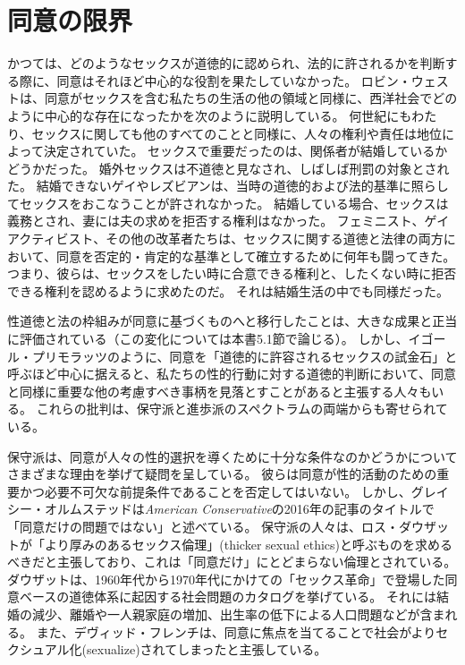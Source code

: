 \documentclass[paper=a4,book,openany]{jlreq}
\newcommand{\ig}[1]{}           %
\begin{document}
\section{同意の限界}

かつては、どのようなセックスが道徳的に認められ、法的に許されるかを判断する際に、同意はそれほど中心的な役割を果たしていなかった。
ロビン・ウェスト\ig{Robin West}は、同意がセックスを含む私たちの生活の他の領域と同様に、西洋社会でどのように中心的な存在になったかを次のように説明している。
何世紀にもわたり、セックスに関しても他のすべてのことと同様に、人々の権利や責任は地位によって決定されていた。
セックスで重要だったのは、関係者が結婚しているかどうかだった。
婚外セックスは不道徳と見なされ、しばしば刑罰の対象とされた。
結婚できないゲイやレズビアンは、当時の道徳的および法的基準に照らしてセックスをおこなうことが許されなかった。
結婚している場合、セックスは義務とされ、妻には夫の求めを拒否する権利はなかった。
フェミニスト、ゲイアクティビスト、その他の改革者たちは、セックスに関する道徳と法律の両方において、同意を否定的・肯定的な基準として確立するために何年も闘ってきた。
つまり、彼らは、セックスをしたい時に合意できる権利と、したくない時に拒否できる権利を認めるように求めたのだ。
それは結婚生活の中でも同様だった\citep[p.7]{west20:_consen_legit_dysph}。

性道徳と法の枠組みが同意に基づくものへと移行したことは、大きな成果と正当に評価されている（この変化については本書5.1節で論じる）。
しかし、イゴール・プリモラッツのように、同意を「道徳的に許容されるセックスの試金石」\citep{primoratz01:_sexual_moral}と呼ぶほど中心に据えると、私たちの性的行動に対する道徳的判断において、同意と同様に重要な他の考慮すべき事柄を見落とすことがあると主張する人々もいる。
これらの批判は、保守派と進歩派のスペクトラムの両端からも寄せられている。

保守派は、同意が人々の性的選択を導くために十分な条件なのかどうかについてさまざまな理由を挙げて疑問を呈している。
彼らは同意が性的活動のための重要かつ必要不可欠な前提条件であることを否定してはいない。
しかし、グレイシー・オルムステッドは\emph{American Conservative}の2016年の記事のタイトルで「同意だけの問題ではない」と述べている\citep{olmstead16:_its_not_just_consen}。
保守派の人々は、ロス・ダウザットが「より厚みのあるセックス倫理」(thicker sexual ethics)と呼ぶものを求めるべきだと主張しており、これは「同意だけ」にとどまらない倫理とされている\citep{douthat17:_age_consen_its_discon}。
ダウザットは、1960年代から1970年代にかけての「セックス革命」で登場した同意ベースの道徳体系に起因する社会問題のカタログを挙げている。
それには結婚の減少、離婚や一人親家庭の増加、出生率の低下による人口問題などが含まれる。
また、デヴィッド・フレンチ\ig{David French}は、同意に焦点を当てることで社会がよりセクシュアル化(sexualize)されてしまったと主張している。
\end{document}
